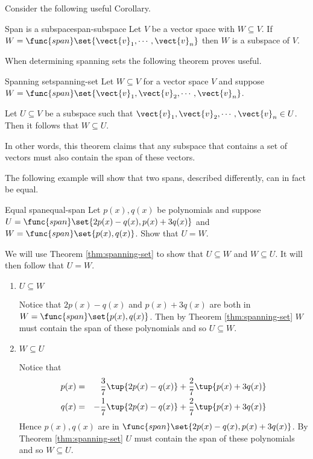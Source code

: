 Consider the following useful Corollary.

\begin{corollary}{Span is a subspace}{span-subspace}
Let $V$ be a vector space with $W \subseteq V$. If $W = \func{span} \set{\vect{v}_1, \cdots,  \vect{v}_n }$ then $W$ is a subspace of $V$.
\end{corollary}

When determining spanning sets the following theorem proves useful.

\begin{theorem}{Spanning set}{spanning-set}
Let $W \subseteq V$ for a vector space $V$ and suppose $W = \func{span} \set{\vect{v}_1, \vect{v}_2, \cdots, \vect{v}_n }$. 

Let $U \subseteq V$ be a subspace such that $\vect{v}_1, \vect{v}_2, \cdots, \vect{v}_n \in U$. Then it follows that $W \subseteq U$. 
\end{theorem}

In other words, this theorem claims that any subspace that contains a set of vectors must also contain the span of these vectors. 

The following example will show that two spans, described differently, can in fact be equal. 

\begin{example}{Equal span}{equal-span}
Let $p(x), q(x)$ be polynomials and suppose $U = \func{span}\set{2p(x) - q(x), p(x) + 3q(x)} $ and $W =  \func{span}\set{p(x), q(x) }$. Show that $U = W$. 
\end{example}

\begin{solution}
We will use Theorem \ref{thm:spanning-set} to show that $U \subseteq W$ and $W \subseteq U$. It will then follow that $U=W$. 
\begin{enumerate}
\item $U \subseteq W$

Notice that $2p(x) - q(x)$ and $p(x) + 3q(x)$  are both in $W = \func{span} \set{p(x), q(x) }$. Then by Theorem \ref{thm:spanning-set} $W$ must contain the span of these polynomials and so $U \subseteq W$. 

\item $W \subseteq U$

Notice that 
\begin{eqnarray*}
p(x) &=& \frac{3}{7} \tup{2p(x) - q(x) }  + \frac{2}{7} \tup{p(x) + 3q(x)} \\
q(x) &=& -\frac{1}{7} \tup{2p(x) - q(x) }  + \frac{2}{7} \tup{p(x) + 3q(x)}
\end{eqnarray*}
Hence $p(x), q(x)$ are in $\func{span} \set{2p(x) - q(x), p(x) + 3q(x) }$. By Theorem \ref{thm:spanning-set} $U$ must contain the span of these polynomials and so $W \subseteq U$. 
\end{enumerate}
\end{solution}

